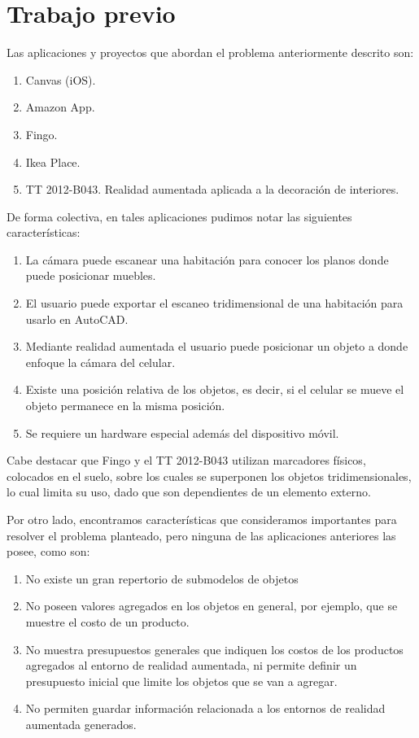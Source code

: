 \section{Trabajo previo}
Las aplicaciones y proyectos que abordan el problema anteriormente descrito son:

\begin{enumerate}
	\item Canvas (iOS).
	\item Amazon App.
	\item Fingo.
	\item Ikea Place.
	\item TT 2012-B043. Realidad aumentada aplicada a la decoración de interiores.
\end{enumerate}

De forma colectiva, en tales aplicaciones pudimos notar las siguientes características:

\begin{enumerate}
	\item La cámara puede escanear una habitación para conocer los planos donde puede posicionar muebles.
	\item El usuario puede exportar el escaneo tridimensional de una habitación para usarlo en AutoCAD.
	\item Mediante realidad aumentada el usuario puede posicionar un objeto a donde enfoque la cámara del celular.
	\item Existe una posición relativa de los objetos, es decir, si el celular se mueve el objeto permanece en la misma posición.
	\item Se requiere un hardware especial además del dispositivo móvil.
\end{enumerate}

Cabe destacar que Fingo y el TT 2012-B043 utilizan marcadores físicos, colocados en el suelo, sobre los cuales se superponen los objetos tridimensionales, lo cual limita su uso, dado que son dependientes de un elemento externo.\par
Por otro lado, encontramos características que consideramos importantes para resolver el problema planteado, pero ninguna de las aplicaciones anteriores las posee, como son:


\begin{enumerate}
	\item No existe un gran repertorio de submodelos de objetos
	\item No poseen valores agregados en los objetos en general, por ejemplo, que se muestre el costo de un producto.
	\item No muestra presupuestos generales que indiquen los costos de los productos agregados al entorno de realidad aumentada, ni permite definir un presupuesto inicial que limite los objetos que se van a agregar.
	\item No permiten guardar información relacionada a los entornos de realidad aumentada generados.
\end{enumerate}

